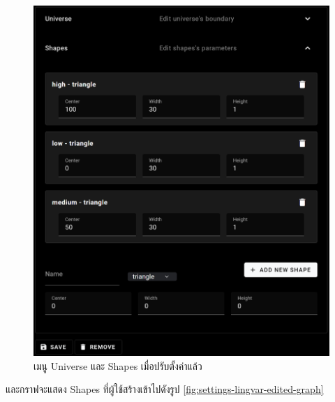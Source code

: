 \begin{figure}[ht]
    \centering
    \includegraphics[scale=0.5]{images/web-tuts/settings-lingvar-edited.PNG}
    \caption{เมนู Universe และ Shapes เมื่อปรับตั้งค่าแล้ว}
    \label{fig:settings-lingvar-edited}
\end{figure}
\FloatBarrier
และกราฟจะแสดง Shapes ที่ผู้ใช้สร้างเข้าไปดังรูป \ref{fig:settings-lingvar-edited-graph}
